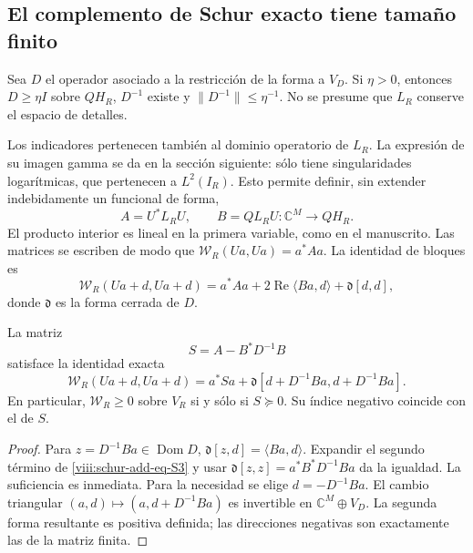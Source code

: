 \subsection{El complemento de Schur exacto tiene tamaño finito}
\label{viii:schur-add-sub-97}

Sea \(D\) el operador asociado a la restricción de la forma a \(V_D\).
Si \(\eta>0\), entonces \(D\geq\eta I\) sobre \(QH_R\),
\(D^{-1}\) existe y \(\|D^{-1}\|\leq\eta^{-1}\).
No se presume que \(L_R\) conserve el espacio de detalles.

Los indicadores pertenecen también al dominio operatorio de \(L_R\).
La expresión de su imagen gamma se da en la sección siguiente: sólo
tiene singularidades logarítmicas, que pertenecen a \(L^2(I_R)\).
Esto permite definir, sin extender indebidamente un funcional de forma,
\begin{equation}
A=U^*L_RU,\qquad B=QL_RU:\mathbb C^M\longrightarrow QH_R.
\label{viii:schur-add-display-6}
\end{equation}
El producto interior es lineal en la primera variable, como en el
manuscrito. Las matrices se escriben de modo que
\(\mathscr W_R(Ua,Ua)=a^*Aa\). La identidad de bloques es
\begin{equation}
\mathscr W_R(Ua+d,Ua+d)
=a^*Aa+2\operatorname{Re}\langle Ba,d\rangle
+\mathfrak d[d,d],
\label{viii:schur-add-display-7}
\end{equation}
donde \(\mathfrak d\) es la forma cerrada de \(D\).

\begin{theorem}
\label{viii:schur-add-schur-exacto}
La matriz
\begin{equation}
S=A-B^*D^{-1}B
\label{viii:schur-add-eq-S2}
\end{equation}
satisface la identidad exacta
\begin{equation}
\boxed{\mathscr W_R(Ua+d,Ua+d)
=a^*Sa+
\mathfrak d[d+D^{-1}Ba,d+D^{-1}Ba].}
\label{viii:schur-add-eq-S3}
\end{equation}
En particular, \(\mathscr W_R\geq0\) sobre \(V_R\) si y sólo si
\(S\succeq0\). Su índice negativo coincide con el de \(S\).
\end{theorem}
\begin{proof} Para \(z=D^{-1}Ba\in\operatorname{Dom}D\),
\(\mathfrak d[z,d]=\langle Ba,d\rangle\). Expandir el segundo término
de \eqref{viii:schur-add-eq-S3} y usar \(\mathfrak d[z,z]=a^*B^*D^{-1}Ba\) da la igualdad.
La suficiencia es inmediata. Para la necesidad se elige
\(d=-D^{-1}Ba\). El cambio triangular \((a,d)\mapsto(a,d+D^{-1}Ba)\)
es invertible en \(\mathbb C^M\oplus V_D\). La segunda forma resultante
es positiva definida; las direcciones negativas son exactamente las de
la matriz finita.
\end{proof}

